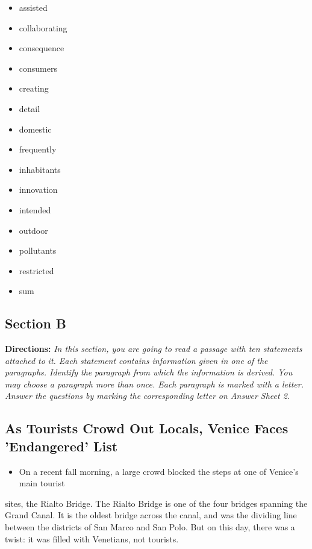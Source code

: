 \documentclass[UTF8,11pt]{ctexart}
\begin{document}
\begin{itemize}[leftmargin=2em,itemsep=.2em,topsep=.4em]\item[A.] assisted
\item[B.] collaborating
\item[C.] consequence
\item[D.] consumers
\item[E.] creating
\item[F.] detail
\item[G.] domestic
\item[H.] frequently
\item[I.] inhabitants
\item[J.] innovation
\item[K.] intended
\item[L.] outdoor
\item[M.] pollutants
\item[N.] restricted
\item[O.] sum
\end{itemize}

\subsection*{\textbf{Section B}}


\textbf{Directions:}\textit{ In this section, you are going to read a passage with ten statements attached to} \textit{it. Each statement contains information given in one of the paragraphs. Identify the} \textit{paragraph from which the information is derived. You may choose a paragraph more than} \textit{once. Each paragraph is marked with a letter. Answer the questions by marking the} \textit{corresponding letter on Answer Sheet 2.}


\subsection*{\textbf{As Tourists Crowd Out Locals, Venice Faces 'Endangered' List}}


\begin{itemize}[leftmargin=2em,itemsep=.2em,topsep=.4em]\item[A.] On a recent fall morning, a large crowd blocked the steps at one of Venice's main tourist
\end{itemize}

sites, the Rialto Bridge. The Rialto Bridge is one of the four bridges spanning the Grand Canal. It is the oldest bridge across the canal, and was the dividing line between the districts of San Marco and San Polo. But on this day, there was a twist: it was filled with Venetians, not tourists.
\end{document}
